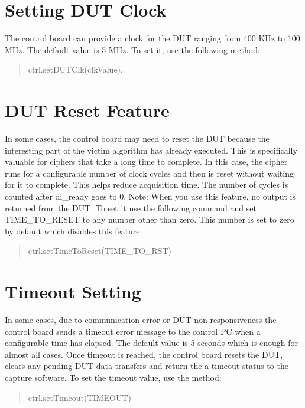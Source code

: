 \documentclass[letterpaper,10pt,english]{sphinxmanual}
\begin{document}
\section{Setting DUT Clock}
\label{\detokenize{controller_features:setting-dut-clock}}
The control board can provide a clock for the DUT ranging from 400 KHz to 100 MHz. The default value is 5 MHz.
To set it, use the following method:
\begin{quote}

ctrl.setDUTClk(clkValue).
\end{quote}


\section{DUT Reset Feature}
\label{\detokenize{controller_features:dut-reset-feature}}
In some cases, the control board may need to reset the DUT because the interesting part of the victim algorithm has already executed. This is specifically valuable for ciphers that take a long time to complete. In this case, the cipher runs for a configurable number of clock cycles and then is reset without waiting for it to complete. This helps reduce acquisition time.
The number of cycles is counted after di\_ready goes to 0.
Note: When you use this feature, no output is returned from the DUT.
To set it use the following command and set TIME\_TO\_RESET to any number other than zero. This number is set to zero by default which disables this feature.
\begin{quote}

ctrl.setTimeToReset(TIME\_TO\_RST)
\end{quote}


\section{Timeout Setting}
\label{\detokenize{controller_features:timeout-setting}}
In some cases, due to communication error or DUT non-responsiveness the control board sends a
timeout error message to the control PC when a configurable time has elapsed. The default value is 5
seconds which is enough for almost all cases. Once timeout is reached, the control board resets the DUT, clears any pending DUT data transfers and return the a timeout status to the capture software.
To set the timeout value, use the method:
\begin{quote}

ctrl.setTimeout(TIMEOUT)
\end{quote}
\end{document}
